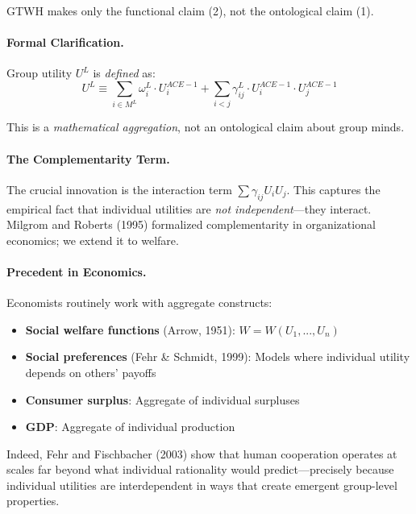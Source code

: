 GTWH makes only the functional claim (2), not the ontological claim (1).

\paragraph{Formal Clarification.}

Group utility $U^L$ is \textit{defined} as:
\begin{equation}
U^L \equiv \sum_{i \in M^L} \omega^L_i \cdot U^{ACE-1}_i + \sum_{i < j} \gamma^L_{ij} \cdot U^{ACE-1}_i \cdot U^{ACE-1}_j
\end{equation}

This is a \textit{mathematical aggregation}, not an ontological claim about group minds.

\paragraph{The Complementarity Term.}

The crucial innovation is the interaction term $\sum \gamma_{ij} U_i U_j$. 
This captures the empirical fact that individual utilities are \textit{not 
independent}---they interact. Milgrom and Roberts (1995) formalized complementarity 
in organizational economics; we extend it to welfare.

\paragraph{Precedent in Economics.}

Economists routinely work with aggregate constructs:
\begin{itemize}[nosep]
\item \textbf{Social welfare functions} (Arrow, 1951): $W = W(U_1, ..., U_n)$
\item \textbf{Social preferences} (Fehr \& Schmidt, 1999): Models where individual 
utility depends on others' payoffs
\item \textbf{Consumer surplus}: Aggregate of individual surpluses
\item \textbf{GDP}: Aggregate of individual production
\end{itemize}

Indeed, Fehr and Fischbacher (2003) show that human cooperation operates at 
scales far beyond what individual rationality would predict---precisely because 
individual utilities are interdependent in ways that create emergent group-level 
properties.

